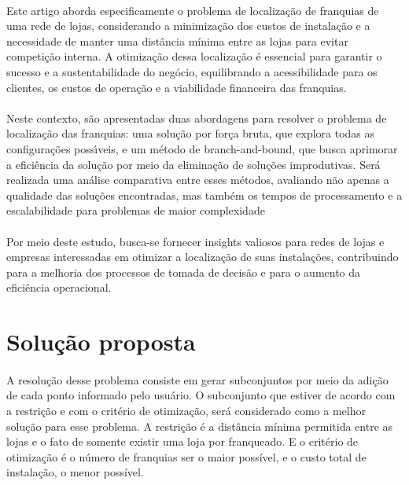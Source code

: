 \documentclass[12pt]{article}
\begin{document}
\paragraph{}Este artigo aborda especificamente o problema de localização de franquias de uma rede de lojas, considerando a minimização dos custos de instalação e a necessidade de manter uma distância mínima entre as lojas para evitar competição interna. A otimização dessa localização é essencial para garantir o sucesso e a sustentabilidade do negócio, equilibrando a acessibilidade para os clientes, os custos de operação e a viabilidade financeira das franquias.

\paragraph{}Neste contexto, são apresentadas duas abordagens para resolver o problema de localização das franquias: uma solução por força bruta, que explora todas as configurações possı́veis, e um método de branch-and-bound, que busca aprimorar a eficiência da solução por meio da eliminação de soluções improdutivas. Será realizada uma análise comparativa entre esses métodos, avaliando não apenas a qualidade das soluções encontradas, mas também os tempos de processamento e a escalabilidade para problemas de maior complexidade

\paragraph{}Por meio deste estudo, busca-se fornecer insights valiosos para redes de lojas e empresas interessadas em otimizar a localização de suas instalações, contribuindo para a melhoria dos processos de tomada de decisão e para o aumento da eficiência operacional.

\section{Solução proposta}

\paragraph{}A resolução desse problema consiste em gerar subconjuntos por meio da adição de cada ponto informado pelo usuário. O subconjunto que estiver de acordo com a restrição e com o critério de otimização, será considerado como a melhor solução para esse problema. A restrição é a distância mínima permitida entre as lojas e o fato de somente existir uma loja por franqueado. E o critério de otimização é o número de franquias ser o maior possível, e o custo total de instalação, o menor possível.
\end{document}
